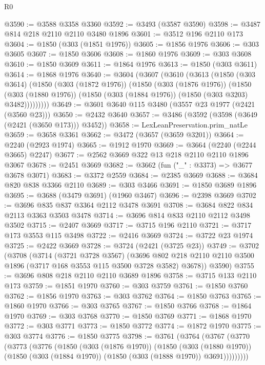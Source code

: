 \begin{lexlean}{R0}
\begin{coremodule}
@3590 := @3588 @3358 @3360
@3592 := @3493 (@3587 @3590)
@3598 := @3487 @814 @218 @2110 @2110 @3480 @1896
@3601 := @3512 @196 @2110 @173
@3604 := @1850 (@303 (@1851 @1976))
@3605 := @1856 @1976
@3606 := @303 @3605
@3607 := @1850 @3606
@3608 := @1860 @1976
@3609 := @303 @3608
@3610 := @1850 @3609
@3611 := @1864 @1976
@3613 := @1850 (@303 @3611)
@3614 := @1868 @1976
@3640 := @3604
    (@3607
      (@3610
        (@3613
          (@1850
            (@303 @3614)
            (@1850
              (@303 (@1872 @1976))
              (@1850
                (@303 (@1876 @1976))
                (@1850
                  (@303 (@1880 @1976))
                  (@1850 (@303 (@1884 @1976)) (@1850 (@303 @3203) @3482)))))))))
@3649 := @3601 @3640 @115 @3480 (@3557 @23 @1977 (@2421 (@3560 @23)))
@3650 := @2432 @3640
@3657 := @3486 (@3592 (@3598 (@3649 (@2421 (@3650 @173))) @3452))
@3658 := LexLeanPreservation.prim_natLe
@3659 := @3658 @3361
@3662 := @3472 (@3657 (@3659 @3201))
@3664 := @2240 (@2923 @1974)
@3665 := @1912 @1970
@3669 := @3664 (@2240 (@2244 @3665) @2247)
@3677 := @2562 @3669 @322 @13 @218 @2110 @2110 @1896 @3067
@3678 := @2451 @3669
@3682 := @3662 (fun ("_" : @3373) => @3677 @3678 @3071)
@3683 := @3372 @2559
@3684 := @2385 @3669
@3688 := @3684 @820 @838 @3366 @2110
@3689 := @303 @3466
@3691 := @1850 @3689 @1896
@3695 := @3688 (@3479 @3691) (@1960 @3467)
@3696 := @2398 @3669
@3702 := @3696 @835 @837 @3364 @2112 @3478 @3691
@3708 := @3684 @822 @834 @2113 @3363 @3503 @3478
@3714 := @3696 @814 @833 @2110 @2112 @3498 @3502
@3715 := @2407 @3669
@3717 := @3715 @196 @2110
@3721 := @3717 @173 @3553 @115 @3498
@3722 := @2416 @3669
@3724 := @3722 @23 @1974
@3725 := @2422 @3669
@3728 := @3724 (@2421 (@3725 @23))
@3749 := @3702
    (@3708
      (@3714
        (@3721 @3728 @3567)
        (@3696 @802 @218 @2110 @2110 @3500 @1896 (@3717 @168 @3553 @115 @3500 @3728 @3582) @3678))
      @3590)
@3755 := @3696 @808 @218 @2110 @2110 @3689 @1896
@3758 := @3715 @133 @2110 @173
@3759 := @1851 @1970
@3760 := @303 @3759
@3761 := @1850 @3760
@3762 := @1856 @1970
@3763 := @303 @3762
@3764 := @1850 @3763
@3765 := @1860 @1970
@3766 := @303 @3765
@3767 := @1850 @3766
@3768 := @1864 @1970
@3769 := @303 @3768
@3770 := @1850 @3769
@3771 := @1868 @1970
@3772 := @303 @3771
@3773 := @1850 @3772
@3774 := @1872 @1970
@3775 := @303 @3774
@3776 := @1850 @3775
@3798 := @3761
    (@3764
      (@3767
        (@3770
          (@3773
            (@3776
              (@1850
                (@303 (@1876 @1970))
                (@1850
                  (@303 (@1880 @1970))
                  (@1850 (@303 (@1884 @1970)) (@1850 (@303 (@1888 @1970)) @3691)))))))))

\end{coremodule}
\end{lexlean}
